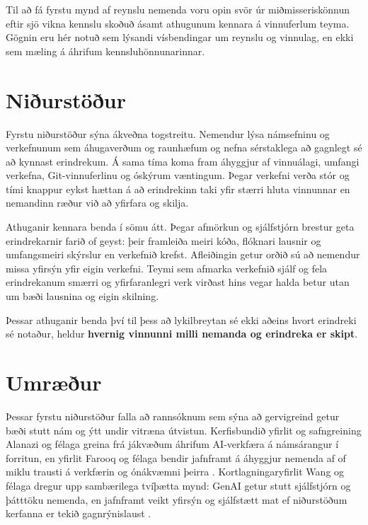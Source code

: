 \documentclass{kennsluakademia_conf}
\begin{document}
Til að fá fyrstu mynd af reynslu nemenda voru opin svör úr
miðmisseriskönnun eftir sjö vikna kennslu skoðuð ásamt athugunum kennara
á vinnuferlum teyma. Gögnin eru hér notuð sem lýsandi vísbendingar um
reynslu og vinnulag, en ekki sem mæling á áhrifum kennsluhönnunarinnar.

\section{Niðurstöður}\label{niuxf0urstuxf6uxf0ur}

Fyrstu niðurstöður sýna ákveðna togstreitu. Nemendur lýsa námsefninu og
verkefnunum sem áhugaverðum og raunhæfum og nefna sérstaklega að
gagnlegt sé að kynnast erindrekum. Á sama tíma koma fram áhyggjur af
vinnuálagi, umfangi verkefna, Git-vinnuferlinu og óskýrum væntingum.
Þegar verkefni verða stór og tími knappur eykst hættan á að erindrekinn
taki yfir stærri hluta vinnunnar en nemandinn ræður við að yfirfara og
skilja.

Athuganir kennara benda í sömu átt. Þegar afmörkun og sjálfstjórn
brestur geta erindrekarnir farið of geyst: þeir framleiða meiri kóða,
flóknari lausnir og umfangsmeiri skýrslur en verkefnið krefst.
Afleiðingin getur orðið sú að nemendur missa yfirsýn yfir eigin
verkefni. Teymi sem afmarka verkefnið sjálf og fela erindrekanum smærri
og yfirfaranlegri verk virðast hins vegar halda betur utan um bæði
lausnina og eigin skilning.

Þessar athuganir benda því til þess að lykilbreytan sé ekki aðeins hvort
erindreki sé notaður, heldur \textbf{hvernig vinnunni milli nemanda og
erindreka er skipt}.

\section{Umræður}\label{umruxe6uxf0ur}

Þessar fyrstu niðurstöður falla að rannsóknum sem sýna að gervigreind
getur bæði stutt nám og ýtt undir vitræna útvistun. Kerfisbundið yfirlit
og safngreining Alanazi og félaga greina frá jákvæðum áhrifum
AI-verkfæra á námsárangur í forritun, en yfirlit Farooq og félaga bendir
jafnframt á áhyggjur nemenda af of miklu trausti á verkfærin og
ónákvæmni þeirra \citep{alanazi2025, farooq2026}. Kortlagningaryfirlit
Wang og félaga dregur upp sambærilega tvíþætta mynd: GenAI getur stutt
sjálfstjórn og þátttöku nemenda, en jafnframt veikt yfirsýn og
sjálfstætt mat ef niðurstöðum kerfanna er tekið gagnrýnislaust
\citep{wang2026}.
\end{document}
